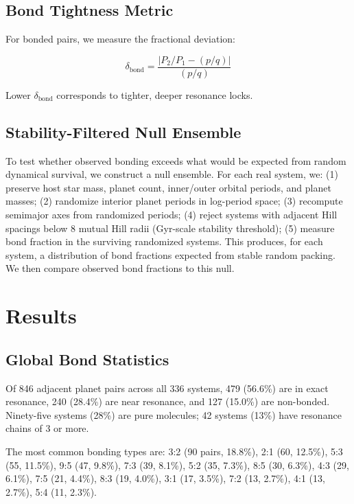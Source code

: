 \documentclass[twocolumn]{aastex631}
\begin{document}
\subsection{Bond Tightness Metric}

For bonded pairs, we measure the fractional deviation:

\begin{equation}
  \delta_{\text{bond}} = \frac{|P_2/P_1 - (p/q)|}{(p/q)}
\end{equation}

Lower $\delta_{\text{bond}}$ corresponds to tighter, deeper resonance locks.

\subsection{Stability-Filtered Null Ensemble}

To test whether observed bonding exceeds what would be expected from random
dynamical survival, we construct a null ensemble. For each real system, we:
(1) preserve host star mass, planet count, inner/outer orbital periods, and
planet masses; (2) randomize interior planet periods in log-period space;
(3) recompute semimajor axes from randomized periods; (4) reject systems with
adjacent Hill spacings below 8 mutual Hill radii (Gyr-scale stability
threshold); (5) measure bond fraction in the surviving randomized systems.
This produces, for each system, a distribution of bond fractions expected from
stable random packing. We then compare observed bond fractions to this null.

\section{Results}
\label{sec:results}

\subsection{Global Bond Statistics}

Of 846 adjacent planet pairs across all 336 systems, 479 (56.6\%) are in exact
resonance, 240 (28.4\%) are near resonance, and 127 (15.0\%) are non-bonded.
Ninety-five systems (28\%) are pure molecules; 42 systems (13\%) have resonance
chains of 3 or more.

The most common bonding types are: 3:2 (90 pairs, 18.8\%), 2:1 (60, 12.5\%),
5:3 (55, 11.5\%), 9:5 (47, 9.8\%), 7:3 (39, 8.1\%), 5:2 (35, 7.3\%), 8:5 (30,
6.3\%), 4:3 (29, 6.1\%), 7:5 (21, 4.4\%), 8:3 (19, 4.0\%), 3:1 (17, 3.5\%),
7:2 (13, 2.7\%), 4:1 (13, 2.7\%), 5:4 (11, 2.3\%).
\end{document}
